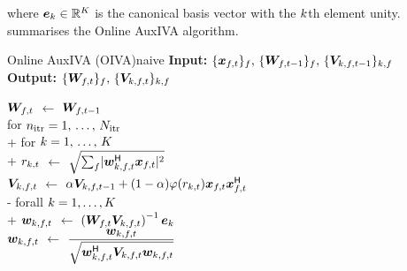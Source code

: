 \documentclass[sip,biber]{now-journal}
\begin{document}
where $\bm{e} _{k} \in \mathbb{R} ^{K}$ is the canonical basis vector with the $k$th element unity.
 summarises the Online AuxIVA algorithm.
\begin{algorithm}{Online AuxIVA (OIVA)}{naive}
  \textbf{Input:} $\{\Obs _{\ft}\} _{\freq},\, \{\Demix _{\ft[-1]}\}_{\freq},\, \{\cov _{\src,\ft[-1]}\}_{\src,\freq}$\\
  \textbf{Output:} $\{\Demix _{\ft}\}_{\freq},\, \{\cov _{\src,\ft}\}_{\src,\freq}$
  \begin{pseudo}
    {$\Demix _{\ft}$} $\gets$ $\Demix _{\ft[-1]}$ \ct{$(\forall \freq)$} \\
    for $n _{\mathrm{itr}} = 1,\, \dots,\, N _{\mathrm{itr}}$ \\+
      for $k = 1,\, \dots,\, K$ \\+
        {$r _{k,t}$} $\gets$ $\sqrt{\sum _{\freq} \abs{\demix _{\src,\ft} ^{\hermite} \Obs _{\ft}} ^2}$ \\
        {$\cov _{\src,\ft}    $} $\gets$ $\forget \cov _{\src,\ft[-1]} + (1 - \forget) \weight(\var _{\src,\tframe}) \Obs _{\ft} \Obs _{\ft} ^{\hermite}$ \ct{$(\forall \freq)$}\\-
      forall $k = 1, \dots, K$ \\+
        {$\demix _{\src,\ft}$} $\gets$ $\left(\Demix _{\ft} \cov _{\src,\ft}\right) ^{-1} \eye _{\src}$ \ct{$(\forall \freq)$}\\
        {$\demix _{\src,\ft}$} $\gets$ $\dfrac{\demix _{\src,\ft}}{\sqrt{\demix _{\src,\ft} ^{\hermite} \cov _{\src,\ft} \demix _{\src,\ft}}}$ \ct{$(\forall \freq)$}
  \end{pseudo}
\end{algorithm}
\end{document}
